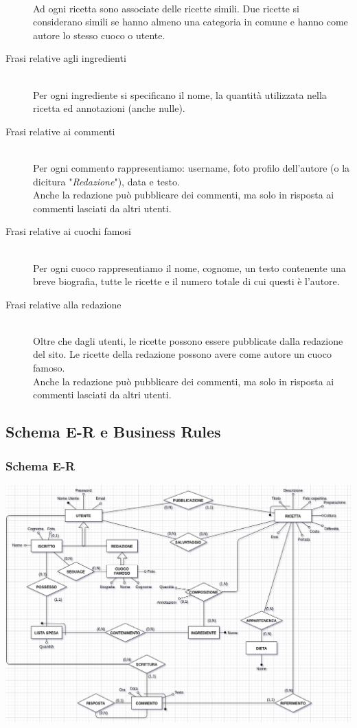 \documentclass[12pt]{extarticle}
\begin{document}
\begin{description}
    \\ Ad ogni ricetta sono associate delle ricette simili. Due ricette si considerano simili se hanno almeno una categoria in comune e hanno come autore lo stesso cuoco o utente.
    \item[Frasi relative agli ingredienti] \hfill
    \\ Per ogni ingrediente si specificano il nome, la quantità utilizzata nella ricetta ed annotazioni (anche nulle).
    \item[Frasi relative ai commenti] \hfill
    \\ Per ogni commento rappresentiamo: username, foto profilo dell'autore (o la dicitura "\textit{Redazione}"), data e testo.
    \\ Anche la redazione può pubblicare dei commenti, ma solo in risposta ai commenti lasciati da altri utenti.    
    \item[Frasi relative ai cuochi famosi] \hfill
    \\ Per ogni cuoco rappresentiamo il nome, cognome, un testo contenente una breve biografia, tutte le ricette e il numero totale di cui questi è l'autore.
    \item[Frasi relative alla redazione] \hfill  
    \\ Oltre che dagli utenti, le ricette possono essere pubblicate dalla redazione del sito. Le ricette della redazione possono avere come autore un cuoco famoso.
    \\ Anche la redazione può pubblicare dei commenti, ma solo in risposta ai commenti lasciati da altri utenti.    
\end{description}


\subsection{Schema E-R e Business Rules}
\subsubsection{Schema E-R}

\includegraphics[width=\textwidth]{er1.png}
\end{document}

